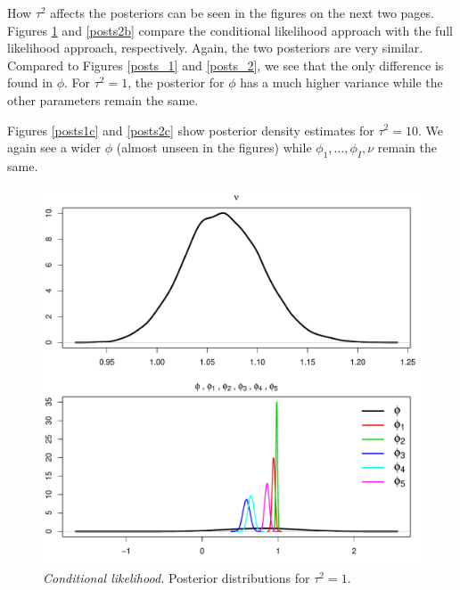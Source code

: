 \documentclass[12pt]{article}
\begin{document}
\noindent How $\tau^2$ affects the posteriors can be seen in the figures on the next two pages. Figures \ref{posts1b} and \ref{posts2b} compare the conditional likelihood approach with the full likelihood approach, respectively. Again, the two posteriors are very similar. Compared to Figures \ref{posts_1} and \ref{posts_2}, we see that the only difference is found in $\phi$. For $\tau^2=1$, the posterior for $\phi$ has a much higher variance while the other parameters remain the same.
\bigskip

\noindent Figures \ref{posts1c} and \ref{posts2c} show posterior density estimates for $\tau^2=10$. We again see a wider $\phi$ (almost unseen in the figures) while $\phi_1,\ldots,\phi_I,\nu$ remain the same.

\newpage 

\begin{figure}[H]
\begin{center}
\includegraphics[scale=0.45]{figs/posts_1b.pdf}
\end{center}
\caption{\emph{Conditional likelihood.} Posterior distributions for $\tau^2=1$.}
\label{posts1b}
\end{figure}
\end{document}
